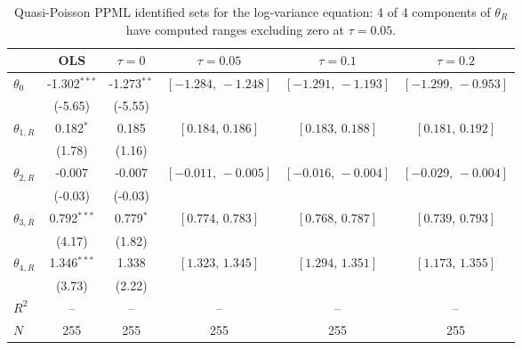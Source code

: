 \documentclass[11pt]{article}
\begin{document}
\begin{table}[!htbp]
\centering
\begin{threeparttable}
\caption{Quasi-Poisson PPML identified sets for the log-variance equation: 4 of 4 components of $\theta_R$ have computed ranges excluding zero at $\tau{=}0.05$.}
\label{tab:log_var_eq_set_id}
\footnotesize\setlength{\tabcolsep}{3pt}
\begin{tabular}{lccccc}
\toprule
 & OLS & $\tau{=}0$ & $\tau{=}0.05$ & $\tau{=}0.1$ & $\tau{=}0.2$ \\
\midrule
$\theta_0$ & -1.302$^{***}$ & -1.273$^{**}$ & $[-1.284,\,-1.248]$ & $[-1.291,\,-1.193]$ & $[-1.299,\,-0.953]$ \\
 & (-5.65) & (-5.55) &  &  &  \\
\midrule
$\theta_{1,R}$ & 0.182$^{*}$ & 0.185 & $[0.184,\,0.186]$ & $[0.183,\,0.188]$ & $[0.181,\,0.192]$ \\
 & (1.78) & (1.16) &  &  &  \\
$\theta_{2,R}$ & -0.007 & -0.007 & $[-0.011,\,-0.005]$ & $[-0.016,\,-0.004]$ & $[-0.029,\,-0.004]$ \\
 & (-0.03) & (-0.03) &  &  &  \\
$\theta_{3,R}$ & 0.792$^{***}$ & 0.779$^{*}$ & $[0.774,\,0.783]$ & $[0.768,\,0.787]$ & $[0.739,\,0.793]$ \\
 & (4.17) & (1.82) &  &  &  \\
$\theta_{4,R}$ & 1.346$^{***}$ & 1.338 & $[1.323,\,1.345]$ & $[1.294,\,1.351]$ & $[1.173,\,1.355]$ \\
 & (3.73) & (2.22) &  &  &  \\
$R^2$ & -- & -- & -- & -- & -- \\
$N$ & 255 & 255 & 255 & 255 & 255 \\
\bottomrule
\end{tabular}
\begin{tablenotes}[flushleft]
\scriptsize

\end{tablenotes}
\end{threeparttable}
\end{table}
\end{document}
